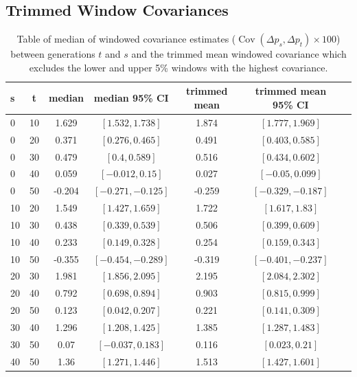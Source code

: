\documentclass[11pt]{article}
\DeclareMathOperator{\cov}{Cov}
\begin{document}
\clearpage

\subsection{\textcite{Barghi2019-qy} Trimmed Window Covariances}
\begin{table}
  \centering
  \footnotesize
  \centering
  \begin{tabular}{l c c c c c c}

    s & t & median & median 95\% CI & trimmed mean & trimmed mean 95\% CI \\ \hline
    0 & 10 & 1.629 & $[1.532, 1.738]$ & 1.874 & $[1.777, 1.969]$ \\
    0 & 20 & 0.371 & $[0.276, 0.465]$ & 0.491 & $[0.403, 0.585]$ \\
    0 & 30 & 0.479 & $[0.4, 0.589]$ & 0.516 & $[0.434, 0.602]$ \\
    0 & 40 & 0.059 & $[-0.012, 0.15]$ & 0.027 & $[-0.05, 0.099]$ \\
    0 & 50 & -0.204 & $[-0.271, -0.125]$ & -0.259 & $[-0.329, -0.187]$ \\
    10 & 20 & 1.549 & $[1.427, 1.659]$ & 1.722 & $[1.617, 1.83]$ \\
    10 & 30 & 0.438 & $[0.339, 0.539]$ & 0.506 & $[0.399, 0.609]$ \\
    10 & 40 & 0.233 & $[0.149, 0.328]$ & 0.254 & $[0.159, 0.343]$ \\
    10 & 50 & -0.355 & $[-0.454, -0.289]$ & -0.319 & $[-0.401, -0.237]$ \\
    20 & 30 & 1.981 & $[1.856, 2.095]$ & 2.195 & $[2.084, 2.302]$ \\
    20 & 40 & 0.792 & $[0.698, 0.894]$ & 0.903 & $[0.815, 0.999]$ \\
    20 & 50 & 0.123 & $[0.042, 0.207]$ & 0.221 & $[0.141, 0.309]$ \\
    30 & 40 & 1.296 & $[1.208, 1.425]$ & 1.385 & $[1.287, 1.483]$ \\
    30 & 50 & 0.07 & $[-0.037, 0.183]$ & 0.116 & $[0.023, 0.21]$ \\
    40 & 50 & 1.36 & $[1.271, 1.446]$ & 1.513 & $[1.427, 1.601]$ \\


   \end{tabular}
   \caption{Table of median of windowed covariance estimates ($\cov(\Delta p_s,
     \Delta p_t) \times 100$) between generations $t$ and $s$ and the trimmed
     mean windowed covariance which excludes the lower and upper 5\% windows
     with the highest covariance.}
  \label{supp:table-trimmed-mean}

\end{table}
\end{document}
